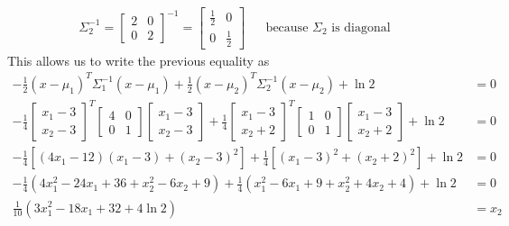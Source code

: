\documentclass[a4paper, 10pt, twoside]{article}
\begin{document}
\begin{enumerate}[a)]
\begin{align}
              \Sigma_2^{-1} = \begin{bmatrix}2 & 0 \\ 0 & 2\end{bmatrix}^{-1} = \begin{bmatrix}\frac{1}{2} & 0 \\ 0 & \frac{1}{2}\end{bmatrix} &  & \text{because } \Sigma_2 \text{ is diagonal}
          \end{align}
          This allows us to write the previous equality as
          \begin{align*}
              - \frac{1}{2}(x-\mu_1)^T \Sigma_1^{-1}(x-\mu_1) + \frac{1}{2}(x-\mu_2)^T \Sigma_2^{-1}(x-\mu_2)  + \ln 2                                                                                              & = 0   \\
              - \frac{1}{4}\begin{bmatrix}x_1-3 \\ x_2-3\end{bmatrix}^T \begin{bmatrix}4 & 0 \\ 0 & 1\end{bmatrix}\begin{bmatrix}x_1-3 \\ x_2-3\end{bmatrix} + \frac{1}{4}\begin{bmatrix}x_1-3 \\ x_2+2\end{bmatrix}^T\begin{bmatrix}1 & 0 \\ 0 & 1\end{bmatrix}\begin{bmatrix}x_1-3 \\ x_2+2\end{bmatrix}  + \ln 2 & = 0   \\
              - \frac{1}{4}[(4x_1-12)(x_1-3)+(x_2-3)^2] + \frac{1}{4}[(x_1-3)^2+(x_2+2)^2] + \ln 2                                                                                                                  & = 0   \\
              -\frac{1}{4}(4x_1^2 -24x_1 + 36 + x_2^2 -6x_2+9) + \frac{1}{4}(x_1^2-6x_1+9+x_2^2+4x_2+4) + \ln 2                                                                                                     & = 0   \\
              \frac{1}{10}(3x_1^2 -18x_1 +32 + 4\ln 2)                                                                                                                                                          & = x_2

\end{align*}
\end{enumerate}
\end{document}
